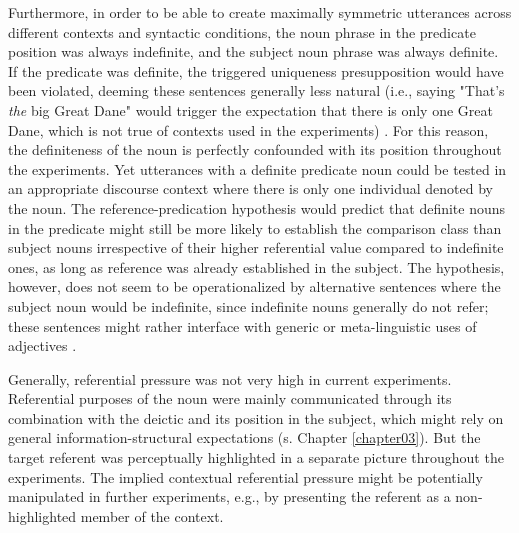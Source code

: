 Furthermore, in order to be able to create maximally symmetric utterances across different contexts and syntactic conditions, the noun phrase in the predicate position was always indefinite, and the subject noun phrase was always definite. If the predicate was definite, the triggered uniqueness presupposition would have been violated, deeming these sentences generally less natural (i.e., saying "That's \emph{the} big Great Dane" would trigger the expectation that there is only one Great Dane, which is not true of contexts used in the experiments) \parencite[cf.][]{syrett2010meaning}. 
For this reason, the definiteness of the noun is perfectly confounded with its position throughout the experiments. Yet utterances with a definite predicate noun could be tested in an appropriate discourse context where there is only one individual denoted by the noun. The reference-predication hypothesis would predict that definite nouns in the predicate might still be more likely to establish the comparison class than subject nouns irrespective of their higher referential value compared to indefinite ones, as long as reference was already established in the subject. 
The hypothesis, however, does not seem to be operationalized by alternative sentences where the subject noun would be indefinite, since indefinite nouns generally do not refer; these sentences might rather interface with generic or meta-linguistic uses of adjectives \parencite{Reboul2001, tessler2019language, barker2002dynamics}. 

Generally, referential pressure was not very high in current experiments. Referential purposes of the noun were mainly communicated through its combination with the deictic and its position in the subject, which might rely on general information-structural expectations (s. Chapter \ref{chapter03}). But the target referent was perceptually highlighted in a separate picture throughout the experiments. The implied contextual referential pressure might be potentially manipulated in further experiments, e.g., by presenting the referent as a non-highlighted member of the context. 

